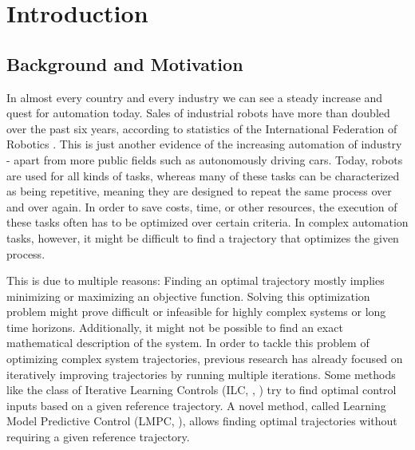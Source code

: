 \chapter{Introduction}
\section{Background and Motivation}
In almost every country and every industry we can see a steady increase and quest for automation today. Sales of industrial robots have more than doubled over the past six years, according to statistics of the International Federation of Robotics \cite{IFR2016}. This is just another evidence of the increasing automation of industry - apart from more public fields such as autonomously driving cars. Today, robots are used for all kinds of tasks, whereas many of these tasks can be characterized as being repetitive, meaning they are designed to repeat the same process over and over again. In order to save costs, time, or other resources, the execution of these tasks often has to be optimized over certain criteria. In complex automation tasks, however, it might be difficult to find a trajectory that optimizes the given process.

This is due to multiple reasons: Finding an optimal trajectory mostly implies minimizing or maximizing an objective function. Solving this optimization problem might prove difficult or infeasible for highly complex systems or long time horizons. Additionally, it might not be possible to find an exact mathematical description of the system.
In order to tackle this problem of optimizing complex system trajectories, previous research has already focused on iteratively improving trajectories by running multiple iterations. Some methods like the class of Iterative Learning Controls (ILC, \cite{Lee2007}, \cite{Bristow2006}) try to find optimal control inputs based on a given reference trajectory. A novel method, called Learning Model Predictive Control (LMPC, \cite{Rosolia2016}), allows finding optimal trajectories without requiring a given reference trajectory.

